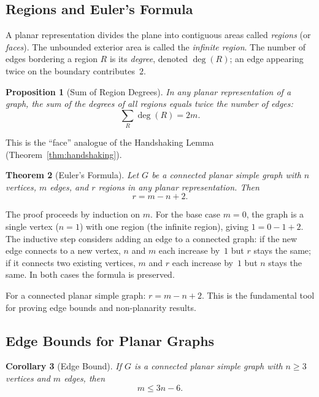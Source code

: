 \documentclass[11pt, a4paper, notitlepage]{report}
\newtheorem{theorem}{Theorem}[section]
\newtheorem{corollary}[theorem]{Corollary}
\newtheorem{proposition}[theorem]{Proposition}
\theoremstyle{definition}
\theoremstyle{remark}
\begin{document}
\subsection{Regions and Euler's Formula}
\label{subsec:euler-formula}

A planar representation divides the plane into contiguous areas called \emph{regions} (or \emph{faces}). The unbounded exterior area is called the \emph{infinite region}. The number of edges bordering a region $R$ is its \emph{degree}, denoted $\deg(R)$; an edge appearing twice on the boundary contributes~$2$.

\begin{proposition}[Sum of Region Degrees]
\label{prop:region-degree-sum}
In any planar representation of a graph, the sum of the degrees of all regions equals twice the number of edges:
\[
\sum_{R} \deg(R) = 2m.
\]
\end{proposition}

This is the ``face'' analogue of the Handshaking Lemma (Theorem~\ref{thm:handshaking}).

\begin{theorem}[Euler's Formula]
\label{thm:euler-formula}
Let $G$ be a connected planar simple graph with $n$ vertices, $m$ edges, and $r$ regions in any planar representation. Then
\[
r = m - n + 2.
\]
\end{theorem}

The proof proceeds by induction on $m$. For the base case $m = 0$, the graph is a single vertex ($n = 1$) with one region (the infinite region), giving $1 = 0 - 1 + 2$. The inductive step considers adding an edge to a connected graph: if the new edge connects to a new vertex, $n$ and $m$ each increase by~$1$ but $r$ stays the same; if it connects two existing vertices, $m$ and $r$ each increase by~$1$ but $n$ stays the same. In both cases the formula is preserved.

\begin{keyresult}[title={Key Result: Euler's Formula}]
For a connected planar simple graph: $r = m - n + 2$. This is the fundamental tool for proving edge bounds and non-planarity results.
\end{keyresult}

\subsection{Edge Bounds for Planar Graphs}
\label{subsec:edge-bounds}

\begin{corollary}[Edge Bound]
\label{cor:planar-edge-bound}
If $G$ is a connected planar simple graph with $n \geq 3$ vertices and $m$ edges, then
\[
m \leq 3n - 6.
\]
\end{corollary}
\end{document}
